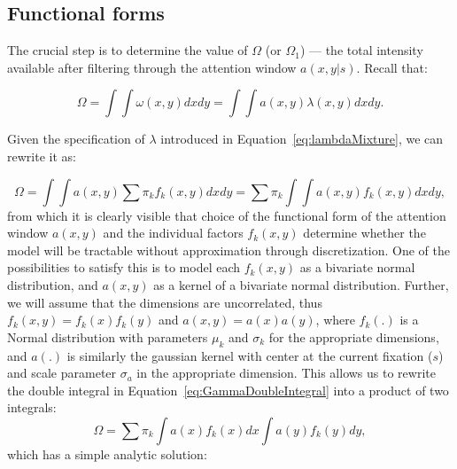\documentclass{article}
\begin{document}
\subsection{Functional forms}

The crucial step is to determine the value of $\Omega$ (or $\Omega_1$) --- the total intensity available after filtering through the attention window $a(x, y |
s)$. Recall that: 

\begin{equation}
    \Omega = \int \int \omega(x, y) dx dy=  \int \int a(x, y) \lambda(x, y)dx dy.
\end{equation}

Given the specification of $\lambda$ introduced in Equation~\ref{eq:lambdaMixture}, we can rewrite it as:

\begin{equation}
\label{eq:GammaDoubleIntegral}
    \Omega = \int \int a(x, y) \sum \pi_k f_k(x, y) dx dy = \sum \pi_k \int \int a(x, y) f_k(x, y) dx dy,
\end{equation}
from which it is clearly visible that choice of the functional form of the attention window $a(x, y)$ and the individual factors $f_k(x, y)$ determine whether the model will be tractable without approximation through discretization. One of the possibilities to satisfy this is to model each $f_k(x, y)$ as a bivariate normal distribution, and $a(x, y)$ as a kernel of a bivariate normal distribution. Further, we will assume that the dimensions are uncorrelated, thus $f_k(x, y) = f_k(x)f_k(y)$ and $a(x, y) = a(x)a(y)$, where $f_k(.)$ is a Normal distribution with parameters $\mu_k$ and $\sigma_k$ for the appropriate dimensions, and $a(.)$ is similarly the gaussian kernel with center at the current fixation ($s$) and scale parameter $\sigma_a$ in the appropriate dimension. This allows us to rewrite the double integral in Equation~\ref{eq:GammaDoubleIntegral} into a product of two integrals:
\begin{equation}
    \Omega =  \sum \pi_k \int a(x)f_k(x) dx \int a(y)f_k(y) dy, 
\end{equation}
which has a simple analytic solution:
\end{document}
